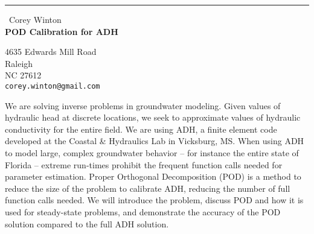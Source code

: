 \documentclass{report}
\begin{document}
\begin{center}
\rule{6in}{1pt} \
{\large Corey Winton \\
{\bf POD Calibration for ADH}}

4635 Edwards Mill Road \\ Raleigh \\ NC 27612
\\
{\tt corey.winton@gmail.com}\end{center}

We are solving inverse problems in groundwater modeling. Given values
of hydraulic head at discrete locations, we seek to approximate values
of hydraulic conductivity for the entire field. We are using ADH, a
finite element code developed at the Coastal & Hydraulics Lab in
Vicksburg, MS. When using ADH to model large, complex groundwater
behavior -- for instance the entire state of Florida -- extreme
run-times prohibit the frequent function calls needed for parameter
estimation. Proper Orthogonal Decomposition (POD) is a method to
reduce the size of the problem to calibrate ADH, reducing the number
of full function calls needed. We will introduce the problem, discuss
POD and how it is used for steady-state problems, and demonstrate
the accuracy of the POD solution compared to the full ADH solution.
\end{document}

